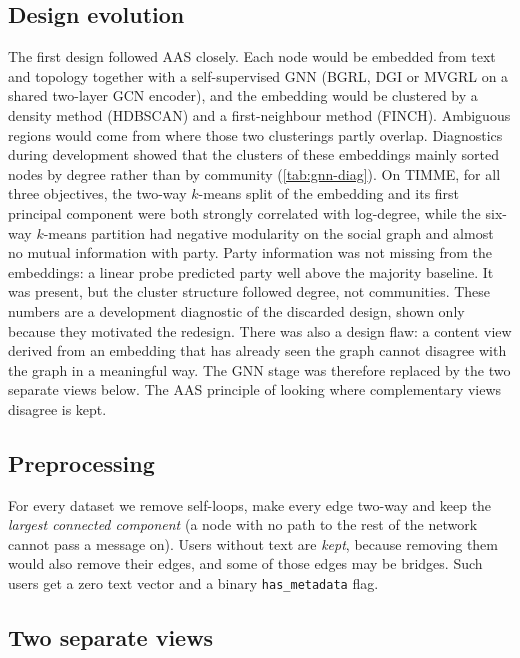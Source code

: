 \subsection{Design evolution}
\label{sec:method-evolution}
The first design followed AAS closely. Each node would be embedded from text and
topology together with a self-supervised GNN (BGRL, DGI or MVGRL on a shared two-layer
GCN encoder), and the embedding would be clustered by a density method (HDBSCAN) and a
first-neighbour method (FINCH). Ambiguous regions would come from where those two
clusterings partly overlap. Diagnostics during development showed that the clusters of
these embeddings mainly sorted nodes by degree rather than by community
(\cref{tab:gnn-diag}). On TIMME, for all three objectives, the two-way $k$-means split
of the embedding and its first principal component were both strongly correlated with
log-degree, while the six-way $k$-means partition had negative modularity on the
social graph and almost no mutual information with party. Party information was not
missing from the embeddings: a linear probe predicted party well above the majority
baseline. It was present, but the cluster structure followed degree, not communities.
These numbers are a development diagnostic of the discarded design, shown only because
they motivated the redesign. There was also a design flaw: a content view derived from
an embedding that has already seen the graph cannot disagree with the graph in a
meaningful way. The GNN stage was therefore replaced by the two separate views below. The AAS principle of looking where
complementary views disagree is kept.



\subsection{Preprocessing}
\label{sec:method-pre}
For every dataset we remove self-loops, make every edge two-way and keep the
\emph{largest connected component} (a node with no path to the rest of the network
cannot pass a message on). Users without text are \emph{kept}, because removing them
would also remove their edges, and some of those edges may be bridges. Such users get
a zero text vector and a binary \texttt{has\_metadata} flag.

\subsection{Two separate views}
\label{sec:method-views}


